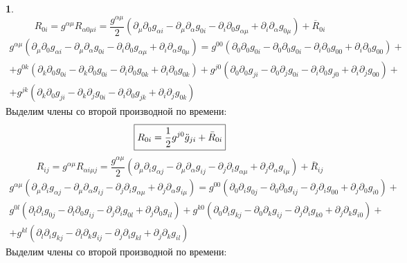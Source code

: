 \documentclass[12pt]{article}
\theoremstyle{definition}
\newtheorem{zad}{}[section]
\begin{document}
\begin{zad}
\begin{equation}
    R_{0i}=g^{\alpha\mu}R_{\alpha0\mu i}=\frac{g^{\alpha\mu}}{2}(\partial_\mu\partial_0 g_{\alpha i}-\partial_\mu\partial_\alpha g_{0i}-\partial_i\partial_0 g_{\alpha\mu}+\partial_i\partial_\alpha g_{0\mu})+\overline{R}_{0i}
\end{equation}
\begin{multline}
    g^{\alpha\mu}(\partial_\mu\partial_0 g_{\alpha i}-\partial_\mu\partial_\alpha g_{0i}-\partial_i\partial_0 g_{\alpha\mu}+\partial_i\partial_\alpha g_{0\mu})=g^{00}(\partial_0\partial_0 g_{0 i}-\partial_0\partial_0 g_{0i}-\partial_i\partial_0 g_{00}+\partial_i\partial_0 g_{00})+\\+g^{0k}(\partial_k\partial_0 g_{0i}-\partial_k\partial_0 g_{0i}-\partial_i\partial_0 g_{0k}+\partial_i\partial_0 g_{0k})+g^{j0}(\partial_0\partial_0 g_{j i}-\partial_0\partial_j g_{0i}-\partial_i\partial_0 g_{j0}+\partial_i\partial_j g_{00})+\\+g^{jk}(\partial_k\partial_0 g_{ji}-\partial_k\partial_j g_{0i}-\partial_i\partial_0 g_{jk}+\partial_i\partial_j g_{0k})
\end{multline}
Выделим члены со второй производной по времени:
\begin{equation}
    \boxed{R_{0i}=\frac{1}{2}g^{j0}\ddot{g}_{ji}+\Bar{R}_{0i}}
\end{equation}
\begin{equation}
    R_{ij}=g^{\alpha\mu}R_{\alpha i\mu j}=\frac{g^{\alpha\mu}}{2}(\partial_\mu\partial_i g_{\alpha j}-\partial_\mu\partial_\alpha g_{ij}-\partial_j\partial_i g_{\alpha\mu}+\partial_j\partial_\alpha g_{i\mu})+\overline{R}_{ij}
\end{equation}
\begin{multline}
    g^{\alpha\mu}(\partial_\mu\partial_i g_{\alpha j}-\partial_\mu\partial_\alpha g_{ij}-\partial_j\partial_i g_{\alpha\mu}+\partial_j\partial_\alpha g_{i\mu})=g^{00}(\partial_0\partial_i g_{0 j}-\partial_0\partial_0 g_{ij}-\partial_j\partial_i g_{00}+\partial_j\partial_0 g_{i0})+\\g^{0l}(\partial_l\partial_i g_{0 j}-\partial_l\partial_0 g_{ij}-\partial_j\partial_i g_{0l}+\partial_j\partial_0 g_{il})+g^{k0}(\partial_0\partial_i g_{kj}-\partial_0\partial_k g_{ij}-\partial_j\partial_i g_{k0}+\partial_j\partial_k g_{i0})+\\+g^{kl}(\partial_l\partial_i g_{k j}-\partial_l\partial_k g_{ij}-\partial_j\partial_i g_{kl}+\partial_j\partial_k g_{il})
\end{multline}
Выделим члены со второй производной по времени:
\begin{equation}

\end{equation}
\end{zad}
\end{document}
